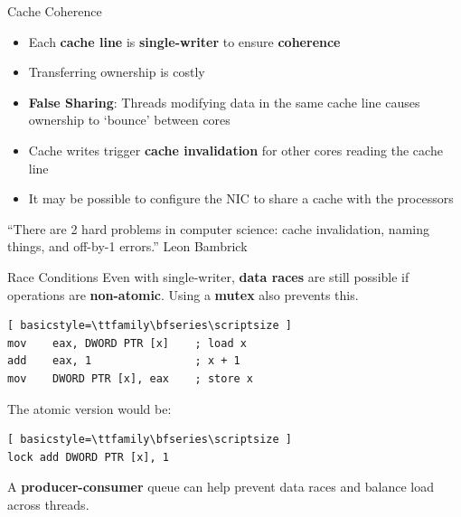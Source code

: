 \documentclass{beamer}
\begin{document}
\begin{frame}{Cache Coherence}
	\begin{itemize}
		\item Each \textbf{cache line} is \textbf{single-writer} to ensure \textbf{coherence}
		\item Transferring ownership is costly
		\item \textbf{False Sharing}: Threads modifying data in the same cache line causes ownership to `bounce' between cores
		\item Cache writes trigger \textbf{cache invalidation} for other cores reading the cache line
		\item It may be possible to configure the NIC to share a cache with the processors
	\end{itemize}
	
	\begin{block}{}
		``There are 2 hard problems in computer science: cache invalidation, naming things, and off-by-1 errors.'' Leon Bambrick
	\end{block}
\end{frame}

\begin{frame}[fragile]{Race Conditions}
	Even with single-writer, \textbf{data races} are still possible if operations are \textbf{non-atomic}. Using a \textbf{mutex} also prevents this.

\begin{lstlisting}[ basicstyle=\ttfamily\bfseries\scriptsize ]
mov    eax, DWORD PTR [x]    ; load x
add    eax, 1                ; x + 1
mov    DWORD PTR [x], eax    ; store x
\end{lstlisting}

	The atomic version would be:
\begin{lstlisting}[ basicstyle=\ttfamily\bfseries\scriptsize ]
lock add DWORD PTR [x], 1
\end{lstlisting}

	A \textbf{producer-consumer} queue can help prevent data races and balance load across threads.
\end{frame}
\end{document}
